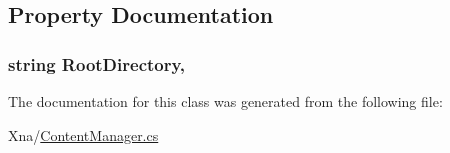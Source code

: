 \subsection{Property Documentation}
\hypertarget{classMicrosoft_1_1Xna_1_1Framework_1_1Content_1_1ContentManager_a77f60ce89542b3ff7b9790da502c166a}{}
\subsubsection[{Root\+Directory}]{\setlength{\rightskip}{0pt plus 5cm}string Root\+Directory\hspace{0.3cm}{\ttfamily [get]}, {\ttfamily [set]}}\label{classMicrosoft_1_1Xna_1_1Framework_1_1Content_1_1ContentManager_a77f60ce89542b3ff7b9790da502c166a}


The documentation for this class was generated from the following file\+:\begin{DoxyCompactItemize}
\item 
Xna/\hyperlink{ContentManager_8cs}{Content\+Manager.\+cs}\end{DoxyCompactItemize}
